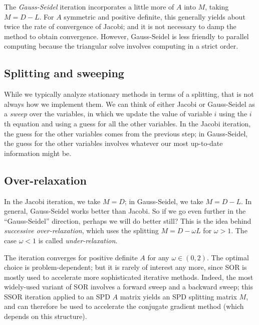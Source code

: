 \documentclass[12pt, leqno]{article} %
\begin{document}
The {\em Gauss-Seidel} iteration incorporates a little more of $A$ into
$M$, taking $M = D-L$.  For $A$ symmetric and positive definite, this
generally yields about twice the rate of convergence of Jacobi; and it
is not necessary to damp the method to obtain convergence.  However,
Gauss-Seidel is less friendly to parallel computing because the
triangular solve involves computing in a strict order.

\subsection{Splitting and sweeping}

While we typically analyze stationary methods in terms of a splitting,
that is not always how we implement them.  We can think of either Jacobi
or Gauss-Seidel as a {\em sweep} over the variables, in which we update
the value of variable $i$ using the $i$th equation and using a guess for
all the other variables.  In the Jacobi iteration, the guess for the
other variables comes from the previous step; in Gauss-Seidel, the guess
for the other variables involves whatever our most up-to-date information
might be.

%
%
%

\subsection{Over-relaxation}

In the Jacobi iteration, we take $M = D$; in Gauss-Seidel, we take $M = D-L$.
In general, Gauss-Seidel works better than Jacobi.  So if we go even further
in the ``Gauss-Seidel'' direction, perhaps we will do better still?  This is
the idea behind {\em successive over-relaxation}, which uses the splitting
$M = D-\omega L$ for $\omega > 1$.  The case $\omega < 1$ is called
{\em under-relaxation}.

The iteration converges for positive definite $A$ for any $\omega \in (0,2)$.
The optimal choice is problem-dependent; but it is rarely of interest any
more, since SOR is mostly used to accelerate more sophisticated iterative
methods.  Indeed, the most widely-used variant of SOR involves a
forward sweep and a backward sweep; this SSOR iteration applied to an SPD $A$
matrix yields an SPD splitting matrix $M$, and can therefore be used to
accelerate the conjugate gradient method (which depends on this structure).
\end{document}
